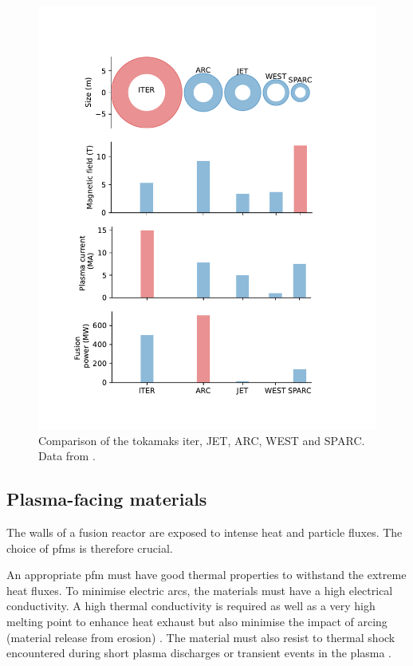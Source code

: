 \begin{figure}
    \includegraphics[width=0.9\linewidth]{Figures/Chapter1/comparison_reactors.pdf}
    \caption{Comparison of the tokamaks \acrshort{iter}, JET, ARC, WEST and SPARC. Data from \cite{delaporte-mathurin_remdelaportemathurinfusion-world_2022}.}
\end{figure}

\subsection{Plasma-facing materials}

The walls of a fusion reactor are exposed to intense heat and particle fluxes.
The choice of \glspl{pfm} is therefore crucial.

An appropriate \gls{pfm} must have good thermal properties to withstand the extreme heat fluxes.
To minimise electric arcs, the materials must have a high electrical conductivity.
A high thermal conductivity is required as well as a very high melting point to enhance heat exhaust but also minimise the impact of arcing (material release from erosion) .
The material must also resist to thermal shock encountered during short \gls{plasma} discharges or transient events in the \gls{plasma} .

